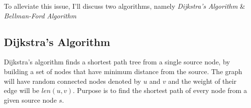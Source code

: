 \documentclass[11pt,a4paper]{extarticle}
\begin{document}
To alleviate this issue, I'll discuss two algorithms, namely \textit{Dijkstra's Algorithm} \& \textit{Bellman-Ford Algorithm}

\subsection{Dijkstra's Algorithm}
Dijkstra’s algorithm finds a shortest path tree from a single source node, by building a set of nodes that have minimum distance from the source. The graph will have random connected nodes denoted by $u$ and $v$ and the weight of their edge will be $len(u,v)$. Purpose is to find the shortest path of every node from a given source node $s$.

\begin{adjustwidth}{2.5em}{0pt}

\end{adjustwidth}
\end{document}
